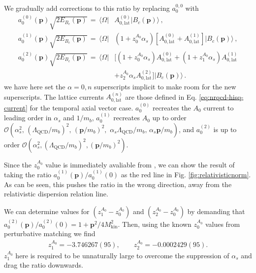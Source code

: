 We gradually add corrections to this ratio by replacing $a_0^{0,0}$ with
\begin{align}
  \nonumber
  \label{eq:a_0corrections}
  a_0^{(0)}({\textbf{p}}) \sqrt{2E_{B_c}({\textbf{p}})} \,=\, \langle \Omega |& A_{0,\text{lat}}^{(0)} | B_c  ({\textbf{p}}) \rangle\,, \\
  \nonumber
  a_0^{(1)}({\textbf{p}}) \sqrt{2E_{B_c}({\textbf{p}})} \,=\, \langle \Omega |& (1+z^{A_0}_0 \alpha_s ) \left[A_{0,\text{lat}}^{(0)} +  A_{0,\text{lat}}^{(1)} \right] | B_c({\textbf{p}}) \rangle\,, \\
  \nonumber
  a_0^{(2)}({\textbf{p}}) \sqrt{2E_{B_c}({\textbf{p}})} \,=\, \langle \Omega |& \big[ (1+z^{A_0}_0 \alpha_s ) A_{0,\text{lat}}^{(0)} + (1 + z^{A_0}_1\alpha_s) A_{0,\text{lat}}^{(1)} \\ &+ z^{A_0}_2\alpha_s A_{0,\text{lat}}^{(2)}  \big] | B_c({\textbf{p}})\rangle\,.
\end{align}
we have here set the $\alpha=0,n$ superscripts implicit to make room for the new superscripts. The lattice currents $A_{0,\text{lat}}^{(n)}$ are those defined in Eq. \eqref{eq:nrqcd-hisq-current} for the temporal axial vector case. $a_0^{(0)}$ recreates the $A_0$ current to leading order in $\alpha_s$ and $1/m_b$, $a_0^{(1)}$ recreates $A_0$ up to order $\mathcal{O}(\alpha_s^2, \,(\Lambda_{\text{QCD}}/m_b)^2,\, ({\textbf{p}}/m_b)^2,\,\,\alpha_s \Lambda_{\text{QCD}} / m_b,\, \alpha_s {\textbf{p}}/m_b )$, and $a_0^{(2)}$ is up to order $\mathcal{O}( \alpha_s^2, (\Lambda_{\text{QCD}}/m_b)^2, ({\textbf{p}}/m_b)^2 )$.

Since the $z_0^{A_0}$ value is immediately avaliable from \cite{Monahan:2012dq}, we can show the result of taking the ratio $a_0^{(1)}({\textbf{p}})/a_0^{(1)}(0)$ as the red line in Fig. \ref{fig:relativisticnorm}. As can be seen, this pushes the ratio in the wrong direction, away from the relativistic dispersion relation line.

  We can determine values for $\left(z_1^{A_0}-z_0^{A_0}\right)$ and $\left(z_2^{A_0}-z_0^{A_0}\right)$ by demanding that $a^{(2)}_0({\textbf{p}})/a^{(2)}_0(0) = 1 + {\textbf{p}}^2/4M_{\text{kin}}^2$. Then, using the known $z_0^{A_0}$ values from perturbative matching we find
  \begin{align}
    z_1^{A_0} = -3.746267(95),\quad\quad z_2^{A_0} = -0.0002429(95).
  \end{align}
  $z_1^{A_0}$ here is required to be unnaturally large to overcome the suppression of $\alpha_s$ and drag the ratio downwards. 

